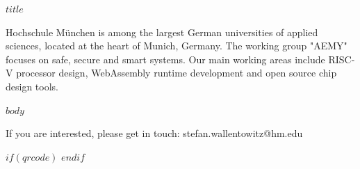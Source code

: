 \documentclass[a4,14pt]{scrreprt}
\begin{document}
\par
{}%
\hfill
{}%
\par

\pagestyle{empty}

\vspace{1cm}

\begin{center}
\begin{minipage}[t]{.8\textwidth}
  \centering
{\Huge \textbf{$title$}}
\end{minipage}
\end{center}

\vspace{1cm}

Hochschule München is among the largest German universities of applied sciences,
located at the heart of Munich, Germany. The working group "AEMY" focuses on
safe, secure and smart systems. Our main working areas include RISC-V processor
design, WebAssembly runtime development and open source chip design tools.

$body$

\vfill

\begin{minipage}[t]{.5\textwidth}
  If you are interested, please get in touch: stefan.wallentowitz@hm.edu
\end{minipage}
\hfill
\begin{minipage}[t]{.3\textwidth}
  \hfill
  $if(qrcode)$  $endif$
\end{minipage}
\end{document}
